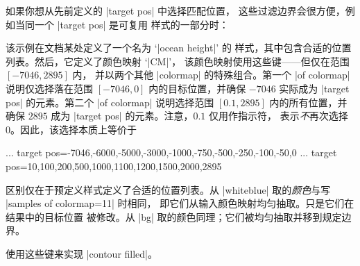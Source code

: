 {\begin{enumerate}
\begin{pgfplotskeylist}
            如果你想从先前定义的 |target pos| 中选择匹配位置，
            这些过滤边界会很方便，例如当同一个 |target pos| 是可复用
            样式的一部分时：
\begin{codeexample}[width=8cm]
\pgfplotscolorbardrawstandalone[
  point meta min=-7046,
  point meta max=2895,
  colormap={whiteblue}{color=(blue) color=(white)},
  colormap={gb}{color=(green) color=(yellow)
      color=(brown)},
  colormap={CM}{
      of colormap={
        whiteblue,
        ocean height,
        target pos min*=
          \pgfkeysvalueof{/pgfplots/point meta min},
        target pos max=0,
        sample for=const,
      },
      of colormap={
        gb,
        ocean height,
        target pos min=0.1,
        target pos max*=
          \pgfkeysvalueof{/pgfplots/point meta max},
        sample for=const,
      },
  },
  colorbar horizontal,
  colormap access=const]
\end{codeexample}
            \noindent 该示例在文档某处定义了一个名为 `|ocean height|' 的
            样式，其中包含合适的位置列表。然后，它定义了颜色映射 `|CM|'，
            该颜色映射使用这些键——但仅在范围 $[-7046,2895]$ 内，
            并以两个其他 |colormap| 的特殊组合。第一个 |of colormap|
            说明仅选择落在范围 $[-7046,0]$ 内的目标位置，并确保
            $-7046$ 实际成为 |target pos| 的元素。第二个 |of colormap|
            说明选择范围 $[0.1,2895]$ 内的所有位置，并确保 $2895$
            成为 |target pos| 的元素。注意，$0.1$ 仅用作指示符，
            表示\emph{不}再次选择 $0$。因此，该选择本质上等价于
\begin{codeexample}
...
target pos={-7046,-6000,-5000,-3000,-1000,-750,-500,-250,-100,-50,0}
...
target pos={10,100,200,500,1000,1100,1200,1500,2000,2895}
\end{codeexample}
            区别仅在于预定义样式定义了合适的位置列表。从 |whiteblue|
            取的\emph{颜色}与写 |samples of colormap={11}| 时相同，
            即它们从输入颜色映射均匀抽取。只是它们在结果中的目标位置
            被修改。从 |bg| 取的颜色同理；它们被均匀抽取并移到规定边界。

            \PGFPlots{} 使用这些键来实现 |contour filled|。


\end{pgfplotskeylist}
\end{enumerate}}
